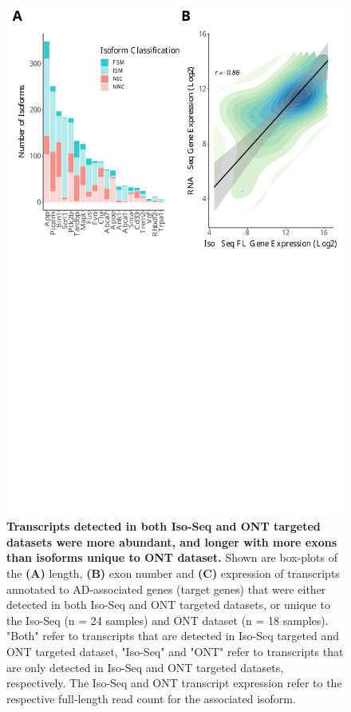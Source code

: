 \begin{figure}[!htp]
	\begin{center}
		\includegraphics[page=4,trim={0 13cm 0 0cm},clip,scale = 0.60]{Figures/ONTvsIsoSeq.pdf}
	\end{center}
	\captionsetup{width=0.95\textwidth}
	\caption[Comparison of commonly-detected and unique isoforms from targeted datasets]%
	{\textbf{Transcripts detected in both Iso-Seq and ONT targeted datasets were more abundant, and longer with more exons than isoforms unique to ONT dataset.} Shown are box-plots of the \textbf{(A)} length, \textbf{(B)} exon number and \textbf{(C)} expression of transcripts annotated to AD-associated genes (target genes) that were either detected in both Iso-Seq and ONT targeted datasets, or unique to the Iso-Seq (n = 24 samples) and ONT dataset (n = 18 samples). "Both" refer to transcripts that are detected in Iso-Seq targeted and ONT targeted dataset, "Iso-Seq" and "ONT" refer to transcripts that are only detected in Iso-Seq and ONT targeted datasets, respectively. The Iso-Seq and ONT transcript expression refer to the respective full-length read count for the associated isoform.}
	\label{fig:ontvsisoseq_description}
\end{figure}

